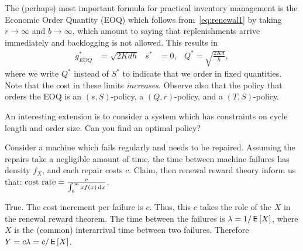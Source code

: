 \documentclass[stochastic-or.tex]{subfiles}
\begin{document}
The (perhaps) most important formula for practical inventory management is the Economic Order Quantity (EOQ) which follows from~\cref{eq:renewal1} by taking $r\to \infty$ and $b\to\infty$, which amount to saying that replenishments arrive immediately and backlogging is not allowed.
This results in
\begin{align*}
g^{*}_{EOQ} &= \sqrt{2Kdh} & s^{*} &= 0, & Q^{*} = \sqrt{\frac{2Kd}{h}},
\end{align*}
where we write $Q^{*}$  instead of $S^{*}$ to indicate that we order in fixed quantities.
Note that the cost in these limits \emph{increases}.
Observe also that the policy that orders the EOQ is an $(s,S)$-policy, a $(Q,r)$-policy, and a $(T,S)$-policy.

An interesting extension is to consider a system which has  constraints on cycle length and order size. Can you find an optimal policy?



\begin{truefalse}
Consider a machine which fails regularly and needs to be repaired.
Assuming the repairs take a negligible amount of time, the time between machine failures has density $f_X$, and each repair costs $c$.
Claim, then renewal reward theory inform us that: $\text{cost rate} = \frac{c}{\int_{0}^{\infty} x f(x) \,\textrm{d}x}$.
    \begin{solution}
        True. The cost increment per failure is $c$. Thus, this $c$ takes the role of the $X$ in the renewal reward theorem. The time between the failures is $\lambda= 1/\,\mathsf{E}\left[X\right]$, where $X$ is the (common) interarrival time between two failures. Therefore $Y = c \lambda = c/ \,\mathsf{E}\left[X\right]$.
    \end{solution}
\end{truefalse}
\end{document}
